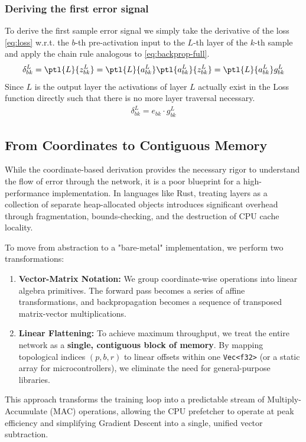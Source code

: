 \subsubsection{Deriving the first error signal}
To derive the first sample error signal we simply take the derivative of the loss \eqref{eq:loss} w.r.t. the $b$-th pre-activation input to the $L$-th layer of the $k$-th sample and apply the chain rule analogous to \eqref{eq:backprop-full}.
\begin{align}
	\delta_{bk}^L=\ptl{L}{z^L_{bk}}=\ptl{L}{a_{bk}^{L}}\ptl{a_{bk}^{L}}{z_{bk}^{L}}=\ptl{L}{a_{bk}^{L}}g_{bk}^L
\end{align}
Since $L$ is the output layer the activations of layer $L$ actually exist in the Loss function directly such that there is no more layer traversal necessary.
\begin{align}
	\label{eq:first-signal}
	\delta_{bk}^L=e_{bk}\cdot g_{bk}^L
\end{align}
\subsection{From Coordinates to Contiguous Memory}
While the coordinate-based derivation provides the necessary rigor to understand the flow of error through the network, it is a poor blueprint for a high-performance implementation. In languages like Rust, treating layers as a collection of separate heap-allocated objects introduces significant overhead through fragmentation, bounds-checking, and the destruction of CPU cache locality.

To move from abstraction to a "bare-metal" implementation, we perform two transformations:

\begin{enumerate}
	\item \textbf{Vector-Matrix Notation:} We group coordinate-wise operations into linear algebra primitives. The forward pass becomes a series of affine transformations, and backpropagation becomes a sequence of transposed matrix-vector multiplications.
	\item \textbf{Linear Flattening:} To achieve maximum throughput, we treat the entire network as a \textbf{single, contiguous block of memory}. By mapping topological indices $(p, b, r)$ to linear offsets within one \texttt{Vec<f32>} (or a static array for microcontrollers), we eliminate the need for general-purpose libraries.
\end{enumerate}

This approach transforms the training loop into a predictable stream of Multiply-Accumulate (MAC) operations, allowing the CPU prefetcher to operate at peak efficiency and simplifying Gradient Descent into a single, unified vector subtraction.

